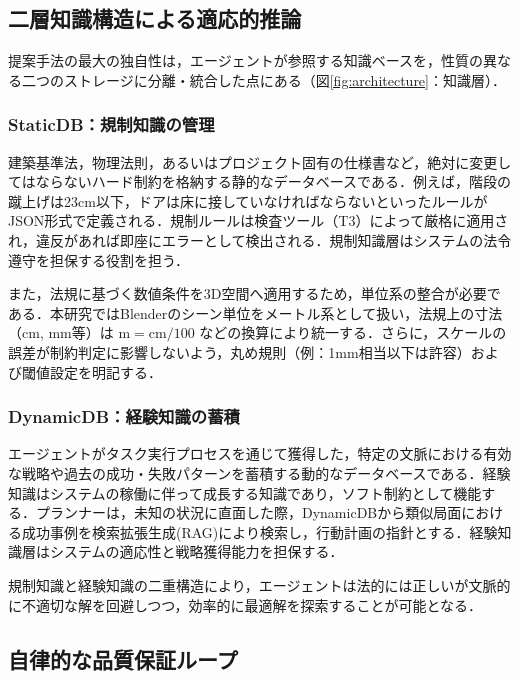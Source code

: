\documentclass[dvipdfmx, a4paper, 9pt]{deimj}
\begin{document}
\subsection{二層知識構造による適応的推論}

提案手法の最大の独自性は，エージェントが参照する知識ベースを，性質の異なる二つのストレージに分離・統合した点にある（図\ref{fig:architecture}：知識層）．

\subsubsection{StaticDB：規制知識の管理}

建築基準法，物理法則，あるいはプロジェクト固有の仕様書など，絶対に変更してはならないハード制約を格納する静的なデータベースである．例えば，階段の蹴上げは23cm以下，ドアは床に接していなければならないといったルールがJSON形式で定義される．規制ルールは検査ツール（T3）によって厳格に適用され，違反があれば即座にエラーとして検出される．規制知識層はシステムの法令遵守を担保する役割を担う．

また，法規に基づく数値条件を3D空間へ適用するため，単位系の整合が必要である．本研究ではBlenderのシーン単位をメートル系として扱い，法規上の寸法（cm, mm等）は $\text{m} = \text{cm}/100$ などの換算により統一する．さらに，スケールの誤差が制約判定に影響しないよう，丸め規則（例：1mm相当以下は許容）および閾値設定を明記する．

\subsubsection{DynamicDB：経験知識の蓄積}

エージェントがタスク実行プロセスを通じて獲得した，特定の文脈における有効な戦略や過去の成功・失敗パターンを蓄積する動的なデータベースである\cite{wang2023voyager}．経験知識はシステムの稼働に伴って成長する知識であり，ソフト制約として機能する．プランナーは，未知の状況に直面した際，DynamicDBから類似局面における成功事例を検索拡張生成(RAG)\cite{lewis2020rag}により検索し，行動計画の指針とする．経験知識層はシステムの適応性と戦略獲得能力を担保する．

規制知識と経験知識の二重構造により，エージェントは法的には正しいが文脈的に不適切な解を回避しつつ，効率的に最適解を探索することが可能となる．

\subsection{自律的な品質保証ループ}
\end{document}
